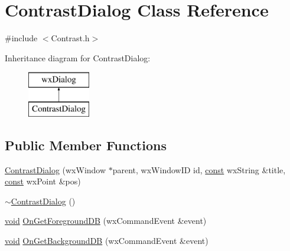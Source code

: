 \hypertarget{class_contrast_dialog}{}\section{Contrast\+Dialog Class Reference}
\label{class_contrast_dialog}


{\ttfamily \#include $<$Contrast.\+h$>$}

Inheritance diagram for Contrast\+Dialog\+:\begin{figure}[H]
\begin{center}
\leavevmode
\includegraphics[height=2.000000cm]{class_contrast_dialog}
\end{center}
\end{figure}
\subsection*{Public Member Functions}
\begin{DoxyCompactItemize}
\item 
\hyperlink{class_contrast_dialog_a5fd6b51455c92a5fb324c9bb1c4fd252}{Contrast\+Dialog} (wx\+Window $\ast$parent, wx\+Window\+ID id, \hyperlink{getopt1_8c_a2c212835823e3c54a8ab6d95c652660e}{const} wx\+String \&title, \hyperlink{getopt1_8c_a2c212835823e3c54a8ab6d95c652660e}{const} wx\+Point \&pos)
\item 
\hyperlink{class_contrast_dialog_a2e5083d67fc353e3b039f8fa42f194e2}{$\sim$\+Contrast\+Dialog} ()
\item 
\hyperlink{sound_8c_ae35f5844602719cf66324f4de2a658b3}{void} \hyperlink{class_contrast_dialog_ad6433f84c8c2d232db16e5317b67e1ba}{On\+Get\+Foreground\+DB} (wx\+Command\+Event \&event)
\item 
\hyperlink{sound_8c_ae35f5844602719cf66324f4de2a658b3}{void} \hyperlink{class_contrast_dialog_aac7a04e3d3e9003f59106c5b584b77c1}{On\+Get\+Background\+DB} (wx\+Command\+Event \&event)
\end{DoxyCompactItemize}
